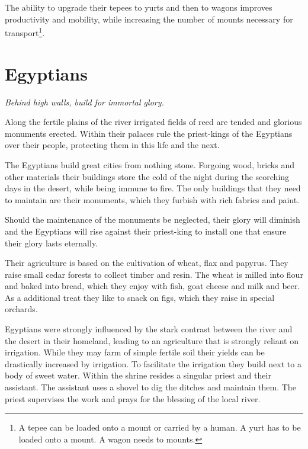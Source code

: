 \documentclass[a4paper]{book}
\begin{document}
		The ability to upgrade their tepees to yurts and then to wagons improves productivity
		and mobility, while increasing the number of mounts necessary for transport\footnote{
			A tepee can be loaded onto a mount or carried by a human.
			A yurt has to be loaded onto a mount.
			A wagon needs to mounts.
		}.

\section{\Gls{Egyptians}}

	\begin{flushright}
		\emph{Behind high walls, build for immortal glory.}
	\end{flushright}

	Along the fertile plains of the river irrigated fields of reed are tended
	and glorious monuments erected.
	Within their palaces rule the priest-kings of the \gls{Egyptians} over their
	people, protecting them in this life and the next.

	The \gls{Egyptians} build great cities from nothing stone.
	Forgoing wood, bricks and other materials their buildings store the cold
	of the night during the scorching days in the desert,
	while being immune to fire.
	The only buildings that they need to maintain are their monuments,
	which they furbish with rich fabrics and paint.

	Should the maintenance of the monuments be neglected,
	their glory will diminish and the \gls{Egyptians} will rise against their
	priest-king to install one that ensure their glory lasts eternally.

	Their agriculture is based on the cultivation of wheat, flax and papyrus.
	They raise small cedar forests to collect timber and resin.
	The wheat is milled into flour and baked into bread,
		which they enjoy with fish, goat cheese and milk and beer.
	As a additional treat they like to snack on figs,
	which they raise in special orchards.

	\Gls{Egyptians} were strongly influenced by the stark contrast between
	the river and the desert in their homeland,
	leading to an agriculture that is strongly reliant on irrigation.
	While they may farm of simple fertile soil their yields can be drastically 
	increased by irrigation.
	To facilitate the irrigation they build  next to a body of sweet water.
	Within the shrine resides a singular priest and their assistant.
	The assistant uses a shovel to dig the ditches and maintain them.
	The priest supervises the work and prays for the blessing of the local river.
\end{document}
